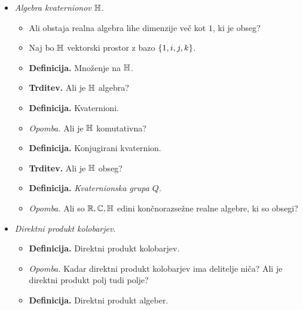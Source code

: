 \begin{enumerate}
\begin{itemize}
        \item \emph{Algebra kvaternionov $\mathbb{H}$}.
        \begin{itemize}
            \item Ali obstaja realna algebra lihe dimenzije več kot $1$, ki je obseg?
            \item Naj bo $\mathbb{H}$ vektorski prostor z bazo $\left\{1, i, j, k\right\}$. 
            \item \colorbox{purple!30}{\textbf{Definicija.}} Množenje na $\mathbb{H}$.
            \item \colorbox{blue!30}{\textbf{Trditev.}} Ali je $\mathbb{H}$ algebra?
            \item \colorbox{purple!30}{\textbf{Definicija.}} Kvaternioni.
            \item \colorbox{yellow!30}{\emph{Opomba.}} Ali je $\mathbb{H}$ komutativna?
            \item \colorbox{purple!30}{\textbf{Definicija.}} Konjugirani kvaternion.
            \item \colorbox{blue!30}{\textbf{Trditev.}} Ali je $\mathbb{H}$ obseg?
            \item \colorbox{purple!30}{\textbf{Definicija.}} \emph{Kvaternionska grupa $Q$}.
            \item \colorbox{yellow!30}{\emph{Opomba.}} Ali so $\mathbb{R}, \mathbb{C}, \mathbb{H}$ edini končnorazsežne realne algebre, ki so obsegi?
        \end{itemize}

        \item \emph{Direktni produkt kolobarjev}.
        \begin{itemize}
            \item \colorbox{purple!30}{\textbf{Definicija.}} Direktni produkt kolobarjev.
            \item \colorbox{yellow!30}{\emph{Opomba.}} Kadar direktni produkt kolobarjev ima delitelje niča? Ali je direktni produkt polj tudi polje?
            \item \colorbox{purple!30}{\textbf{Definicija.}} Direktni produkt algeber.
        \end{itemize}
    \end{itemize}


\end{enumerate}
